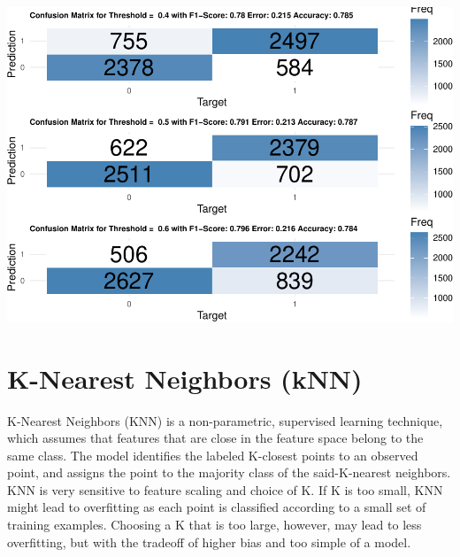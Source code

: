 \documentclass[
]{article}
\begin{document}
\includegraphics{Rain_Australia_files/figure-latex/QDA-1.pdf}

\hypertarget{k-nearest-neighbors-knn}{%
\section{K-Nearest Neighbors (kNN)}\label{k-nearest-neighbors-knn}}

K-Nearest Neighbors (KNN) is a non-parametric, supervised learning
technique, which assumes that features that are close in the feature
space belong to the same class. The model identifies the labeled
K-closest points to an observed point, and assigns the point to the
majority class of the said-K-nearest neighbors. KNN is very sensitive to
feature scaling and choice of K. If K is too small, KNN might lead to
overfitting as each point is classified according to a small set of
training examples. Choosing a K that is too large, however, may lead to
less overfitting, but with the tradeoff of higher bias and too simple of
a model.
\end{document}
